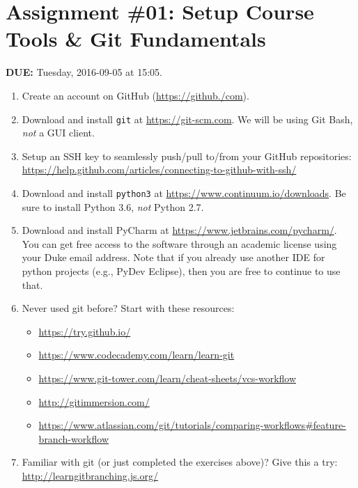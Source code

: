 


\section*{Assignment \#01: Setup Course Tools \& Git Fundamentals}

{\bf DUE:} Tuesday, 2016-09-05 at 15:05.

\begin{enumerate}

\item Create an account on GitHub (\url{https://github./com}). 

\item Download and install \verb+git+ at \url{https://git-scm.com}.  We will be using Git Bash, \emph{not} a GUI client.

\item Setup an SSH key to seamlessly push/pull to/from your GitHub repositories: \url{https://help.github.com/articles/connecting-to-github-with-ssh/}

\item Download and install \verb+python3+ at \url{https://www.continuum.io/downloads}.  Be sure to install Python 3.6, \emph{not} Python 2.7.

\item Download and install PyCharm at \url{https://www.jetbrains.com/pycharm/}.  You can get free access to the software through an academic license using your Duke email address.  Note that if you already use another IDE for python projects (e.g., PyDev Eclipse), then you are free to continue to use that.

\item Never used git before?  Start with these resources:
\begin{itemize}
    \item \url{https://try.github.io/}
    \item \url{https://www.codecademy.com/learn/learn-git}
    \item \url{https://www.git-tower.com/learn/cheat-sheets/vcs-workflow}
    \item \url{http://gitimmersion.com/}
    \item \url{https://www.atlassian.com/git/tutorials/comparing-workflows#feature-branch-workflow}
\end{itemize}

\item Familiar with git (or just completed the exercises above)?  Give this a try: \url{http://learngitbranching.js.org/}


\end{enumerate}
